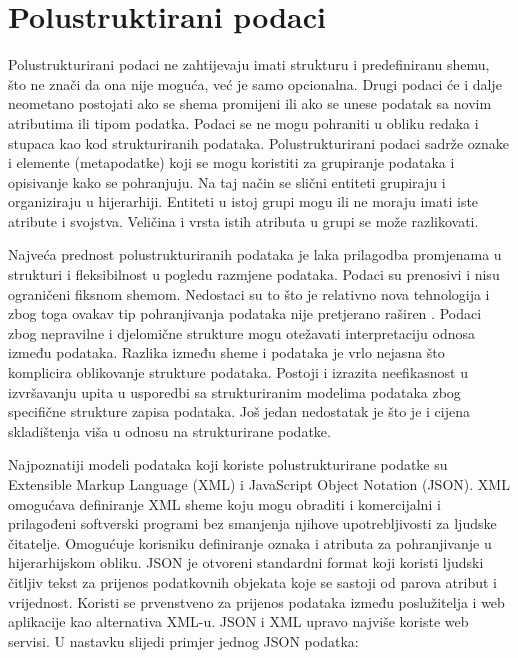 \documentclass{foi}
\begin{document}
\section{Polustruktirani podaci}

Polustrukturirani podaci ne zahtijevaju imati strukturu i predefiniranu shemu, što ne znači da ona nije moguća, već je samo opcionalna. Drugi podaci će i dalje neometano postojati ako se shema promijeni ili ako se unese podatak sa novim atributima ili tipom podatka. Podaci se ne mogu pohraniti u obliku redaka i stupaca kao kod strukturiranih podataka. Polustrukturirani podaci sadrže oznake i elemente (metapodatke) koji se mogu koristiti za grupiranje podataka i opisivanje kako se pohranjuju. Na taj način se slični entiteti grupiraju i organiziraju u hijerarhiji. Entiteti u istoj grupi mogu ili ne moraju imati iste atribute i svojstva. Veličina i vrsta istih atributa u grupi se može razlikovati.

Najveća prednost polustrukturiranih podataka je laka prilagodba promjenama u strukturi i fleksibilnost u pogledu razmjene podataka. Podaci su prenosivi i nisu ograničeni fiksnom shemom. Nedostaci su to što je relativno nova tehnologija i zbog toga ovakav tip pohranjivanja podataka nije pretjerano raširen \cite{unstructuredStructuredSemiStructured}. Podaci zbog nepravilne i djelomične strukture mogu otežavati interpretaciju odnosa između podataka. Razlika između sheme i podataka je vrlo nejasna što komplicira oblikovanje strukture podataka. Postoji i izrazita neefikasnost u izvršavanju upita u usporedbi sa strukturiranim modelima podataka zbog specifične strukture zapisa podataka. Još jedan nedostatak je što je i cijena skladištenja viša u odnosu na strukturirane podatke. \cite{tbpknjiga}

Najpoznatiji modeli podataka koji koriste polustrukturirane podatke su Extensible Markup Language (XML) i JavaScript Object Notation (JSON). XML omogućava definiranje XML sheme koju mogu obraditi i komercijalni i prilagođeni softverski programi bez smanjenja njihove upotrebljivosti za ljudske čitatelje. Omogućuje korisniku definiranje oznaka i atributa za pohranjivanje u hijerarhijskom obliku. JSON je otvoreni standardni format koji koristi ljudski čitljiv tekst za prijenos podatkovnih objekata koje se sastoji od parova atribut i vrijednost. Koristi se prvenstveno za prijenos podataka između poslužitelja i web aplikacije kao alternativa XML-u. JSON i XML upravo najviše koriste web servisi. \cite{cros} U nastavku slijedi primjer jednog JSON podatka:
\end{document}
